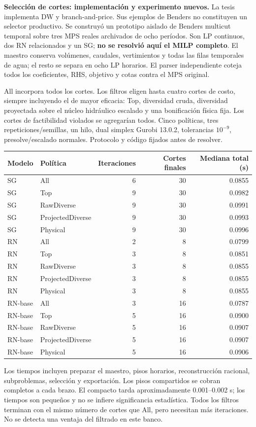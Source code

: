 \documentclass[10pt,a4paper]{article}
\begin{document}
\newpage
\textbf{Selección de cortes: implementación y experimento nuevos.}
La tesis implementa DW y branch-and-price. Sus ejemplos de Benders no constituyen
un selector productivo. Se construyó un prototipo aislado de Benders multicut
temporal sobre tres MPS reales archivados de ocho períodos. Son LP continuos,
dos RN relacionados y un SG; \textbf{no se resolvió aquí el MILP completo}.
El maestro conserva volúmenes, caudales, vertimientos y todas las filas temporales
de agua; el resto se separa en ocho LP horarios. El parser independiente coteja
todos los coeficientes, RHS, objetivo y cotas contra el MPS original.

All incorpora todos los cortes. Los filtros eligen hasta cuatro cortes de costo,
siempre incluyendo el de mayor eficacia: Top, diversidad cruda, diversidad
proyectada sobre el núcleo hidráulico escalado y una bonificación física fija.
Los cortes de factibilidad violados se agregarían todos. Cinco políticas,
tres repeticiones/semillas, un hilo, dual simplex Gurobi 13.0.2, tolerancias
$10^{-9}$, presolve/escalado normales. Protocolo y código fijados antes de resolver.

\begin{center}\small
\begin{tabular}{llrrr}\toprule
Modelo & Política & Iteraciones & Cortes finales & Mediana total (s)\\\midrule
SG & All & 6 & 30 & 0.0855 \\
SG & Top & 9 & 30 & 0.0982 \\
SG & RawDiverse & 9 & 30 & 0.0991 \\
SG & ProjectedDiverse & 9 & 30 & 0.0993 \\
SG & Physical & 9 & 30 & 0.0996 \\
RN & All & 2 & 8 & 0.0799 \\
RN & Top & 3 & 8 & 0.0851 \\
RN & RawDiverse & 3 & 8 & 0.0855 \\
RN & ProjectedDiverse & 3 & 8 & 0.0855 \\
RN & Physical & 3 & 8 & 0.0855 \\
RN-base & All & 3 & 16 & 0.0787 \\
RN-base & Top & 5 & 16 & 0.0900 \\
RN-base & RawDiverse & 5 & 16 & 0.0907 \\
RN-base & ProjectedDiverse & 5 & 16 & 0.0907 \\
RN-base & Physical & 5 & 16 & 0.0906 \\
\bottomrule\end{tabular}
\end{center}
Los tiempos incluyen preparar el maestro, pisos horarios, reconstrucción racional,
subproblemas, selección y exportación. Los pisos compartidos se cobran completos
a cada brazo. El compacto tarda aproximadamente 0.001--0.002 s; los tiempos
son pequeños y no se infiere significancia estadística. Todos los filtros
terminan con el mismo número de cortes que All, pero necesitan más iteraciones.
No se detecta una ventaja del filtrado en este banco.
\end{document}

